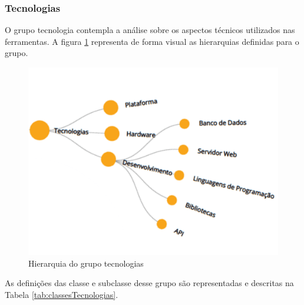 \newpage
\subsubsection{Tecnologias}
\label{subsubsec:tecnologias}
O grupo tecnologia contempla a análise sobre os aspectos técnicos utilizados nas ferramentas.
A figura \ref{fig:grupo-tecnologias} representa de forma visual as hierarquias definidas para o grupo.

\begin{figure}[!ht]
    \centering
    \includegraphics[scale=0.20]{./figuras/tecnologias.png}
    \caption{Hierarquia do grupo tecnologias}
    \label{fig:grupo-tecnologias}
\end{figure}

\par
As definições das classe e subclasse desse grupo são representadas e descritas na Tabela \ref{tab:classesTecnologias}.

